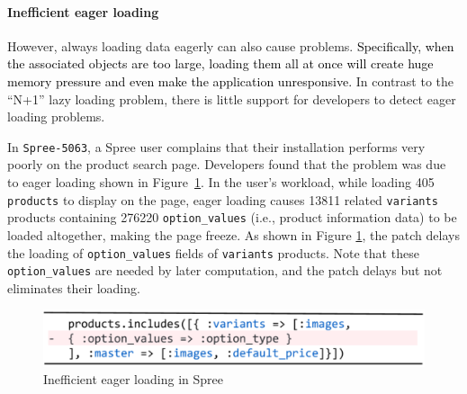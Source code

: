 \vspace{-0.08in} 
\paragraph{\bf{Inefficient eager loading}}
However, always loading data eagerly can also cause problems. \textcolor{black}{ Specifically, when the associated objects are too large, loading them all at once will create huge memory pressure and even make the application unresponsive.}
In contrast to the ``N+1'' lazy loading problem, there is little support for developers to detect eager loading problems. %

In \texttt{Spree-5063}, a Spree user complains that their installation performs very poorly on the product search page. Developers found that the problem was due to eager loading shown in Figure~\ref{fig:spree5063}.
In the user's workload, while loading 405 \texttt{products} to display on the page, eager loading causes 13811 related \texttt{variants} products containing 276220 \texttt{option\_values} (i.e., product information data) to be
loaded altogether, making the page freeze. As shown in 
Figure \ref{fig:spree5063}, the patch delays the loading of
\texttt{option\_values} fields of \texttt{variants} products. Note that these
\texttt{option\_values} are needed by later computation, and the patch
delays but not eliminates their loading.

\begin{figure}
  \centering
\includegraphics[width=0.7\columnwidth]{hownotto/spree5063}
  \caption{Inefficient eager loading in Spree}
  \label{fig:spree5063}
  \vspace{-0.25in}
\end{figure}

